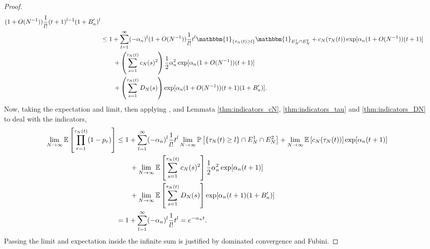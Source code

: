 \documentclass{article}
\newcommand{\Prob}{\mathbb{P}}
\newcommand{\E}{\mathbb{E}}
\newcommand{\I}[1]{\mathbbm{1}_{\{#1\}}}
\newcommand{\1}[1]{\mathbbm{1}_{#1}}
\begin{document}
\begin{proof}
\begin{align}
        (1+O(N^{-1})) \frac{1}{l!} (t+1)^{l-1} (1+B_n^\prime)^l \notag\\
&\leq 1+ \sum_{l=1}^{\infty} (-\alpha_n)^l (1+O(N^{-1})) \frac{1}{l!} t^l
        \I{\tau_N(t) \geq l} \1{E_N^1 \cap E_N^2}
        + c_N(\tau_N(t)) \exp[ \alpha_n (1+O(N^{-1})) (t+1) ] \notag\\
    &\qquad+ \left( \sum_{s=1}^{\tau_N(t)} c_N(s)^2 \right)
        \frac{1}{2} \alpha_n^2 \exp[ \alpha_n (1+O(N^{-1})) (t+1) ] \notag\\
    &\qquad+ \left( \sum_{s=1}^{\tau_N(t)} D_N(s) \right)
        \exp[ \alpha_n (1+O(N^{-1})) (t+1) (1+B_n^\prime) ] . \label{eq:021}
\end{align}
Now, taking the expectation and limit, then applying \citet[Equations (3.3)--(3.5)]{brown2021}, and Lemmata \ref{thm:indicators_cN}, \ref{thm:indicators_tau} and \ref{thm:indicators_DN} to deal with the indicators,
\begin{align}
\lim_{N\to\infty} \E \left[ \prod_{r=1}^{\tau_N(t)} (1-p_r) \right]
&\leq 1+ \sum_{l=1}^{\infty} (-\alpha_n)^l \frac{1}{l!} t^l
        \lim_{N\to\infty} \Prob \left[ \{\tau_N(t) \geq l\} \cap E_N^1 \cap E_N^2 \right]
    + \lim_{N\to\infty} \E \left[ c_N(\tau_N(t)) \right]
        \exp[ \alpha_n (t+1) ] \notag\\
    &\qquad+ \lim_{N\to\infty} \E \left[ \sum_{s=1}^{\tau_N(t)} 
        c_N(s)^2 \right]
        \frac{1}{2} \alpha_n^2 \exp[ \alpha_n (t+1) ] \notag\\
    &\qquad+ \lim_{N\to\infty} \E \left[ \sum_{s=1}^{\tau_N(t)} D_N(s) \right]
        \exp[ \alpha_n (t+1) (1+B_n^\prime) ] \notag\\
&= 1+ \sum_{l=1}^{\infty} (-\alpha_n)^l \frac{1}{l!} t^l
= e^{-\alpha_n t}. \label{eq:022}
\end{align}
Passing the limit and expectation inside the infinite sum is justified by dominated convergence and Fubini.


\end{proof}
\end{document}
